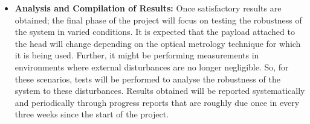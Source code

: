 \documentclass[a4paper,12pt]{report}
\begin{document}
\begin{appendices}
\begin{itemize}
		\item \textbf{Analysis and Compilation of Results:} Once satisfactory results are obtained; the final phase of the project will focus on testing the robustness of the system in varied conditions. It is expected that the payload attached to the head will change depending on the optical metrology technique for which it is being used. Further, it might be performing measurements in environments where external disturbances are no longer negligible. So, for these scenarios, tests will be performed to analyse the robustness of the system to these disturbances.
		Results obtained will be reported systematically and periodically through progress reports that are roughly due once in every three weeks since the start of the project.
	\end{itemize}
	
	


\end{appendices}
\end{document}
